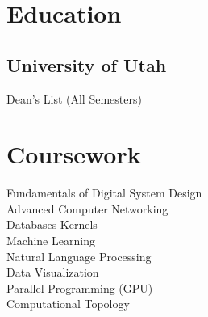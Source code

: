 \documentclass[letterpaper]{deedy-resume} %
\begin{document}

\lastupdated %



\begin{minipage}[t]{0.35\textwidth} %


\section{Education}

\subsection{University of Utah}

Dean's List (All Semesters) \\

\sectionspace %


\section{Coursework}

Fundamentals of Digital System Design \\
Advanced Computer Networking \\
Databases Kernels \\
Machine Learning \\
Natural Language Processing \\
Data Visualization \\
Parallel Programming (GPU) \\
Computational Topology \\



\end{minipage}
\end{document}
